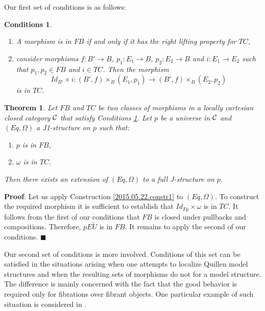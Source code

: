 \documentclass[12pt]{article}
\numberwithin{equation}{section}
\newenvironment{myproof}{{\bf Proof}:}{$\blacksquare$ \vskip 5mm }
\newtheorem{theorem}[proposition]{Theorem}
\newtheorem{cond}[proposition]{Conditions}
\newcommand{\llabel}[1]{\label{#1}}
\newcommand{\sr}{\rightarrow}
\newcommand{\wt}{\widetilde}
\begin{document}
Our first set of conditions is as follows:
%
\begin{cond}\llabel{2015.05.22.cond2}
\begin{enumerate}
\item A morphism is in $FB$ if and only if it has the right lifting property
  for $TC$,
\item consider morphisms $f: B'\sr B$, $p_1:E_1\sr B$, $p_2:E_2\sr B$ and
  $i:E_1\sr E_2$ such that $p_1,p_2\in FB$ and $i\in TC$. Then the morphism
%
$$Id_{B'}\times i: (B',f)\times_B(E_1,p_1)\sr (B',f)\times_B(E_2,p_2)$$
%
is in $TC$.
\end{enumerate}
\end{cond}
%
\begin{theorem}
\llabel{2015.05.22.th1} Let $FB$ and $TC$ be two classes of morphisms in a
locally cartesian closed category $\cal C$ that satisfy Conditions
\ref{2015.05.22.cond2}. Let $p$ be a universe in $\cal C$ and $(Eq,\Omega)$ a
J1-structure on $p$ such that:
%
\begin{enumerate}
\item $p$ is in $FB$,
\item $\omega$ is in $TC$.
\end{enumerate}
%
Then there exists an extension of $(Eq,\Omega)$ to a full J-structure on $p$.
\end{theorem}
%
\begin{myproof}
Let us apply Construction \ref{2015.05.22.constr1} to $(Eq,\Omega)$. To
construct the required morphism it is sufficient to establish that
$Id_{Fp}\times\omega$ is in $TC$. It follows from the first of our conditions
that $FB$ is closed under pullbacks and compositions. Therefore, $pE\wt{U}$ is
in $FB$. It remains to apply the second of our conditions.
\end{myproof}
% 





Our second set of conditions is more involved. Conditions of this set can be
satisfied in the situations arising when one attempts to localize Quillen model
structures and when the resulting sets of morphisms do not for a model
structure. The difference is mainly concerned with the fact that the good
behavior is required only for fibrations over fibrant objects. One particular
example of such situation is considered in \cite[Section 3.3]{SRF}.
\end{document}
